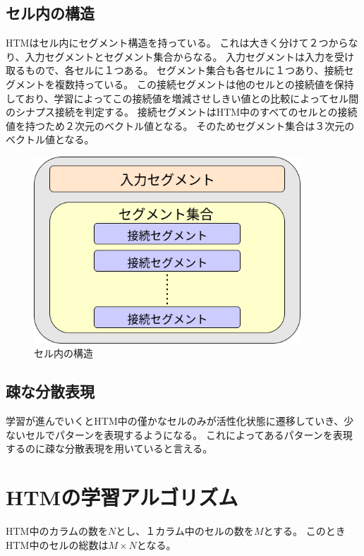 \subsection{セル内の構造}
HTMはセル内にセグメント構造を持っている。
これは大きく分けて２つからなり、入力セグメントとセグメント集合からなる。
入力セグメントは入力を受け取るもので、各セルに１つある。
セグメント集合も各セルに１つあり、接続セグメントを複数持っている。
この接続セグメントは他のセルとの接続値を保持しており、学習によってこの接続値を増減させしきい値との比較によってセル間のシナプス接続を判定する。
接続セグメントはHTM中のすべてのセルとの接続値を持つため２次元のベクトル値となる。
そのためセグメント集合は３次元のベクトル値となる。

\vspace{5mm}
\begin{figure}[ht]
  \begin{center}
    \includegraphics[width=10cm]{./fig/drawing_4}
    \caption{セル内の構造}
    \label{fig:cell_structure}
  \end{center}
\end{figure}

\subsection{疎な分散表現}
学習が進んでいくとHTM中の僅かなセルのみが活性化状態に遷移していき、少ないセルでパターンを表現するようになる。
これによってあるパターンを表現するのに疎な分散表現を用いていると言える。

\section{HTMの学習アルゴリズム}

HTM中のカラムの数を$N$とし、１カラム中のセルの数を$M$とする。
このときHTM中のセルの総数は$M \times N$となる。

